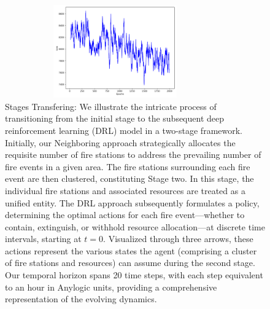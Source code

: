 \documentclass[lettersize,journal]{IEEEtran}
\begin{document}
    \begin{figure}
      \centering
      \includegraphics[height=4cm,width=9.5cm]{figs/manager_critic_loss.png}
      \caption{Stages Transfering: We illustrate the intricate process of transitioning from the initial stage to the subsequent deep reinforcement learning (DRL) model in a two-stage framework. Initially, our Neighboring approach strategically allocates the requisite number of fire stations to address the prevailing number of fire events in a given area. The fire stations surrounding each fire event are then clustered, constituting Stage two. In this stage, the individual fire stations and associated resources are treated as a unified entity. The DRL approach subsequently formulates a policy, determining the optimal actions for each fire event—whether to contain, extinguish, or withhold resource allocation—at discrete time intervals, starting at $t=0$. Visualized through three arrows, these actions represent the various states the agent (comprising a cluster of fire stations and resources) can assume during the second stage. Our temporal horizon spans 20 time steps, with each step equivalent to an hour in Anylogic units, providing a comprehensive representation of the evolving dynamics.}\end{figure}
    
    
    
\end{document}
